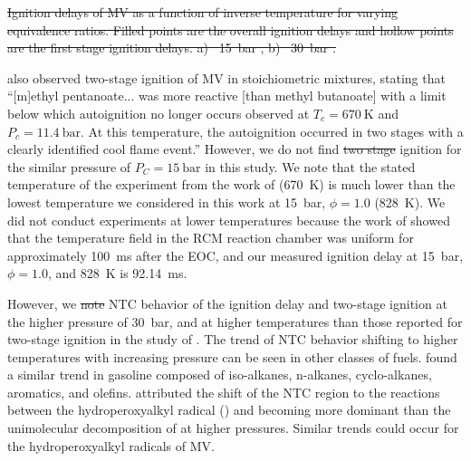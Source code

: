 \documentclass[letterpaper, review, sort&compress]{elsarticle}
\providecommand{\DIFadd}[1]{{\protect\color{blue}\uwave{#1}}} %
\providecommand{\DIFdel}[1]{{\protect\color{red}\sout{#1}}}                      %
\providecommand{\DIFaddbegin}{} %
\providecommand{\DIFaddend}{} %
\providecommand{\DIFdelbegin}{} %
\providecommand{\DIFdelend}{} %
\newcommand{\DIFscaledelfig}{0.5}
\newlength{\DIFdelgraphicswidth} %
\newlength{\DIFdelgraphicsheight} %
\newcommand{\DIFaddincludegraphics}[2][]{{\color{blue}\fbox{\DIFOincludegraphics[#1]{#2}}}} %
\newcommand{\DIFdelincludegraphics}[2][]{%
\sbox{\DIFdelgraphicsbox}{\DIFOincludegraphics[#1]{#2}}%
\settoboxwidth{\DIFdelgraphicswidth}{\DIFdelgraphicsbox} %
\settoboxtotalheight{\DIFdelgraphicsheight}{\DIFdelgraphicsbox} %
\scalebox{\DIFscaledelfig}{%
\parbox[b]{\DIFdelgraphicswidth}{\usebox{\DIFdelgraphicsbox}\\[-\baselineskip] \rule{\DIFdelgraphicswidth}{0em}}\llap{\resizebox{\DIFdelgraphicswidth}{\DIFdelgraphicsheight}{%
\setlength{\unitlength}{\DIFdelgraphicswidth}%
\begin{picture}(1,1)%
\thicklines\linethickness{2pt} %
{\color[rgb]{1,0,0}\put(0,0){\framebox(1,1){}}}%
{\color[rgb]{1,0,0}\put(0,0){\line( 1,1){1}}}%
{\color[rgb]{1,0,0}\put(0,1){\line(1,-1){1}}}%
\end{picture}%
}\hspace*{3pt}}} %
} %
\DeclareRobustCommand{\DIFaddbegin}{\DIFOaddbegin \let\includegraphics\DIFaddincludegraphics} %
\DeclareRobustCommand{\DIFaddend}{\DIFOaddend \let\includegraphics\DIFOincludegraphics} %
\DeclareRobustCommand{\DIFdelbegin}{\DIFOdelbegin \let\includegraphics\DIFdelincludegraphics} %
\DeclareRobustCommand{\DIFdelend}{\DIFOaddend \let\includegraphics\DIFOincludegraphics} %
\begin{document}
\DIFdelbegin %
{%
\DIFdel{Ignition delays of MV as a function of inverse temperature for varying equivalence
    ratios. Filled points are the overall ignition delays and hollow points are the first stage
    ignition delays. a) \mbox{%
\SI{15}{\bar}}\hspace{0pt}%
, b) \mbox{%
\SI{30}{\bar}}\hspace{0pt}%
.}}

\DIFdelend \citet{Hadj-Ali2009} also observed two-stage ignition of MV in stoichiometric mixtures, stating that
``[m]ethyl pentanoate... was more reactive [than methyl butanoate] with a limit below which
autoignition no longer occurs observed at \(T_c = \SI{670}{\K}\) and \(P_c = \SI{11.4}{\bar}\). At
this temperature, the autoignition occurred in two stages with a clearly identified cool flame
event.'' However, we do not find \DIFdelbegin \DIFdel{two stage }\DIFdelend \DIFaddbegin \DIFadd{two-stage }\DIFaddend ignition for the similar pressure of
\(P_C = \SI{15}{\bar}\) in this study. We note that the stated temperature of the experiment from
the work of \citet{Hadj-Ali2009} (\SI{670}{\K}) is much lower than the lowest temperature we
considered in this work at \SI{15}{\bar}, \(\phi=1.0\) (\SI{828}{\K}). We did not conduct
experiments at lower temperatures because the work of \citet{Mittal2006} showed that the temperature
field in the RCM reaction chamber was uniform for approximately \SI{100}{\ms} after the EOC, and our
measured ignition delay at \SI{15}{\bar}, \(\phi=1.0\), and \SI{828}{\K} is \SI{92.14}{\ms}.

However, we \DIFdelbegin \DIFdel{note }\DIFdelend \DIFaddbegin \DIFadd{find }\DIFaddend NTC behavior of the \DIFaddbegin \DIFadd{overall }\DIFaddend ignition delay and two-stage ignition at the higher
pressure of \SI{30}{\bar}, and at higher temperatures than those reported for two-stage ignition in
the study of \citet{Hadj-Ali2009}. The trend of NTC behavior shifting to higher temperatures with
increasing pressure can be seen in other classes of fuels. \citet{Kukkadapu2012} found a similar
trend in gasoline composed of iso-alkanes, n-alkanes, cyclo-alkanes, aromatics, and olefins.
\citet{Kukkadapu2012} attributed the shift of the NTC region to the reactions between the
hydroperoxyalkyl radical () and  becoming more dominant than the unimolecular
decomposition of  at higher pressures. Similar trends could occur for the hydroperoxyalkyl
radicals of MV.
\end{document}
